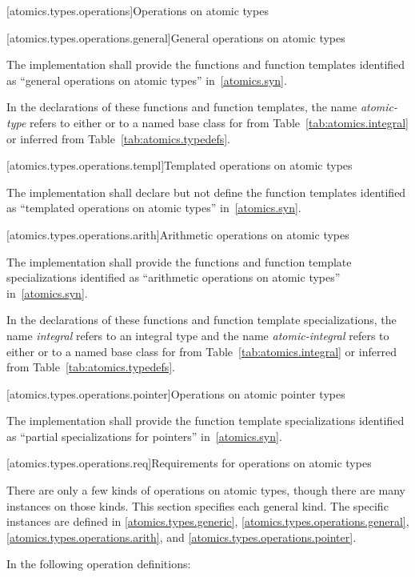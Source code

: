 [atomics.types.operations]{Operations on atomic types}

[atomics.types.operations.general]{General operations on atomic types}

\pnum
The implementation shall provide the functions and function templates identified as ``general operations
on atomic types'' in~\ref{atomics.syn}.

\pnum
In the declarations of these functions and function templates, the name
\textit{atomic-type} refers to either  or to a named base class for 
from Table~\ref{tab:atomics.integral} or inferred from Table~\ref{tab:atomics.typedefs}.

[atomics.types.operations.templ]{Templated operations on atomic types}

\pnum
The implementation shall declare but not define the
function templates identified as ``templated operations on atomic types'' in~\ref{atomics.syn}.

[atomics.types.operations.arith]{Arithmetic operations on atomic types}

\pnum
The implementation shall provide the functions and function template specializations identified as ``arithmetic operations
on atomic types'' in~\ref{atomics.syn}.

\pnum
In the declarations of these functions and function template specializations, the name \textit{integral} refers to an
integral type and the name \textit{atomic-integral} refers to either
 or to a named base class for  from
Table~\ref{tab:atomics.integral} or inferred from Table~\ref{tab:atomics.typedefs}.

[atomics.types.operations.pointer]{Operations on atomic pointer types}

\pnum
The implementation shall provide the function template specializations
identified as ``partial specializations for pointers'' in~\ref{atomics.syn}.

[atomics.types.operations.req]{Requirements for operations on atomic types}

\pnum
There are only a few kinds of operations on atomic types, though there are many
instances on those kinds. This section specifies each general kind. The specific
instances are defined in 
\ref{atomics.types.generic}, \ref{atomics.types.operations.general},
\ref{atomics.types.operations.arith}, and \ref{atomics.types.operations.pointer}.

\pnum
In the following operation definitions:

